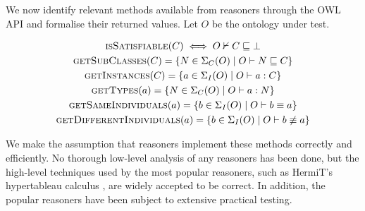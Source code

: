 \documentclass[paper.tex]{subfiles}
\begin{document}
We now identify relevant methods available from reasoners through the OWL API and formalise their returned values.  Let $O$ be the ontology under test.


\begin{gather*}
  \Call{isSatisfiable}{C} \iff O \nsementails C \sqsubseteq \bot \\
  \Call{getSubClasses}{C} = \{ N \in \signatureC(O) \mid O \sementails N \sqsubseteq C \} \\
  \Call{getInstances}{C} = \{ a \in \signatureI(O) \mid O \sementails a : C \} \\
  \Call{getTypes}{a} = \{ N \in \signatureC(O) \mid O \sementails a : N \} \\
  \Call{getSameIndividuals}{a} = \{ b \in \signatureI(O) \mid O \sementails b \equiv a \} \\
  \Call{getDifferentIndividuals}{a} = \{ b \in \signatureI(O) \mid O \sementails b \not\equiv a \}
\end{gather*}

We make the assumption that reasoners implement these methods correctly and efficiently.  No thorough low-level analysis of any reasoners has been done, but the high-level techniques used by the most popular reasoners, such as HermiT's hypertableau calculus \cite{Glimm:HermiT}, are widely accepted to be correct.  In addition, the popular reasoners have been subject to extensive practical testing.
\end{document}
